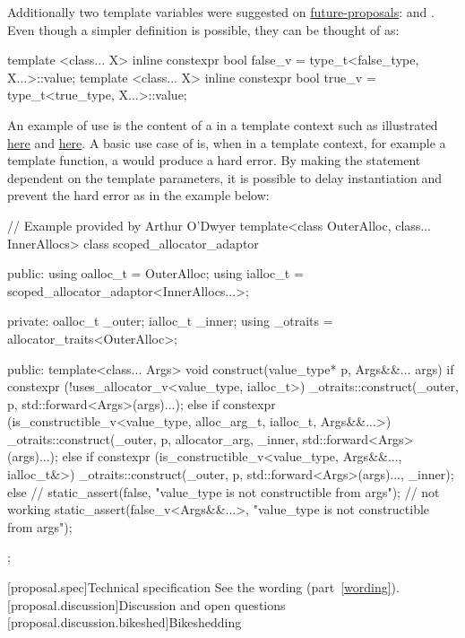 \documentclass[ebook,10pt,oneside,openany,final]{memoir}
\begin{document}
Additionally two template variables were suggested on \href{https://groups.google.com/a/isocpp.org/forum/#!topic/std-proposals/R04CWOjABIQ}{future-proposals}:  and . Even though a simpler definition is possible, they can be thought of as:
\begin{codeblock}
template <class... X> inline constexpr bool false_v = type_t<false_type, X...>::value;
template <class... X> inline constexpr bool true_v = type_t<true_type, X...>::value;
\end{codeblock}
An example of use is the content of a  in a template context such as illustrated \href{https://stackoverflow.com/q/40681645}{here} and \href{https://quuxplusone.github.io/blog/2018/04/02/false-v/}{here}. A basic use case of  is, when in a template context, for example a template function, a  would produce a hard error. By making the  statement dependent on the template parameters, it is possible to delay instantiation and prevent the hard error as in the example below:
\begin{codeblock}
// Example provided by Arthur O'Dwyer
template<class OuterAlloc, class... InnerAllocs>
class scoped_allocator_adaptor {
    public:
    using oalloc_t = OuterAlloc;
    using ialloc_t = scoped_allocator_adaptor<InnerAllocs...>;

    private:
    oalloc_t _outer;
    ialloc_t _inner;
    using _otraits = allocator_traits<OuterAlloc>;

    public:
    template<class... Args>
    void construct(value_type* p, Args&&... args) {
        if constexpr (!uses_allocator_v<value_type, ialloc_t>) {
            _otraits::construct(_outer, p, std::forward<Args>(args)...);
        } else if constexpr (is_constructible_v<value_type, alloc_arg_t, ialloc_t, Args&&...>) {
            _otraits::construct(_outer, p, allocator_arg, _inner, std::forward<Args>(args)...);
        } else if constexpr (is_constructible_v<value_type, Args&&..., ialloc_t&>) {
            _otraits::construct(_outer, p, std::forward<Args>(args)..., _inner);
        } else {
            // static_assert(false, "value_type is not constructible from args"); // not working
            static_assert(false_v<Args&&...>, "value_type is not constructible from args");
        }
    }
};
\end{codeblock}

[proposal.spec]{Technical specification}
See the wording (part~\ref{wording}). 
[proposal.discussion]{Discussion and open questions}
[proposal.discussion.bikeshed]{Bikeshedding}
\end{document}
